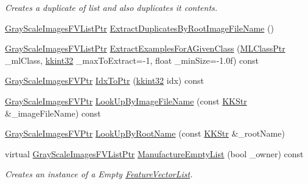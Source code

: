 \begin{DoxyCompactItemize}
\begin{DoxyCompactList}\small\item\em Creates a duplicate of list and also duplicates it contents. \end{DoxyCompactList}\item 
\hyperlink{class_k_k_m_l_l_1_1_gray_scale_images_f_v_list_adf1c0ec2049ac8cb8689dc30f8f78ac3}{Gray\+Scale\+Images\+F\+V\+List\+Ptr} \hyperlink{class_k_k_m_l_l_1_1_gray_scale_images_f_v_list_a0ac0317ca7d6031c420cd8e4197d7328}{Extract\+Duplicates\+By\+Root\+Image\+File\+Name} ()
\item 
\hyperlink{class_k_k_m_l_l_1_1_gray_scale_images_f_v_list_adf1c0ec2049ac8cb8689dc30f8f78ac3}{Gray\+Scale\+Images\+F\+V\+List\+Ptr} \hyperlink{class_k_k_m_l_l_1_1_gray_scale_images_f_v_list_aed5328be7f6d785287f097cf30339f1f}{Extract\+Examples\+For\+A\+Given\+Class} (\hyperlink{namespace_k_k_m_l_l_ac272393853d59e72e8456f14cd6d8c23}{M\+L\+Class\+Ptr} \+\_\+ml\+Class, \hyperlink{namespace_k_k_b_a8fa4952cc84fda1de4bec1fbdd8d5b1b}{kkint32} \+\_\+max\+To\+Extract=-\/1, float \+\_\+min\+Size=-\/1.\+0f) const 
\item 
\hyperlink{namespace_k_k_m_l_l_ac3f21d259a7b1893920f27296d70bc6e}{Gray\+Scale\+Images\+F\+V\+Ptr} \hyperlink{class_k_k_m_l_l_1_1_gray_scale_images_f_v_list_a3dd42fb0b0fdb0a1d3d385a8a2f74842}{Idx\+To\+Ptr} (\hyperlink{namespace_k_k_b_a8fa4952cc84fda1de4bec1fbdd8d5b1b}{kkint32} idx) const 
\item 
\hyperlink{namespace_k_k_m_l_l_ac3f21d259a7b1893920f27296d70bc6e}{Gray\+Scale\+Images\+F\+V\+Ptr} \hyperlink{class_k_k_m_l_l_1_1_gray_scale_images_f_v_list_a8ccec2fcd028640192417782f4fe9b62}{Look\+Up\+By\+Image\+File\+Name} (const \hyperlink{class_k_k_b_1_1_k_k_str}{K\+K\+Str} \&\+\_\+image\+File\+Name) const 
\item 
\hyperlink{namespace_k_k_m_l_l_ac3f21d259a7b1893920f27296d70bc6e}{Gray\+Scale\+Images\+F\+V\+Ptr} \hyperlink{class_k_k_m_l_l_1_1_gray_scale_images_f_v_list_aad0ba82c843773a17fa79372688ab869}{Look\+Up\+By\+Root\+Name} (const \hyperlink{class_k_k_b_1_1_k_k_str}{K\+K\+Str} \&\+\_\+root\+Name)
\item 
virtual \hyperlink{class_k_k_m_l_l_1_1_gray_scale_images_f_v_list_adf1c0ec2049ac8cb8689dc30f8f78ac3}{Gray\+Scale\+Images\+F\+V\+List\+Ptr} \hyperlink{class_k_k_m_l_l_1_1_gray_scale_images_f_v_list_a038934a9764ea7ab08ace2579e02be41}{Manufacture\+Empty\+List} (bool \+\_\+owner) const 
\begin{DoxyCompactList}\small\item\em Creates an instance of a Empty \hyperlink{class_k_k_m_l_l_1_1_feature_vector_list}{Feature\+Vector\+List}. \end{DoxyCompactList}\item 

\end{DoxyCompactItemize}
